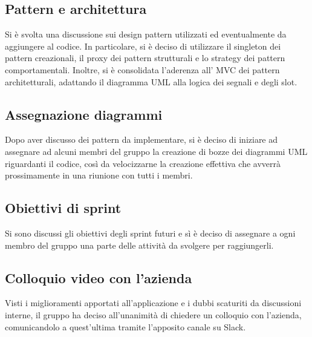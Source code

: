 \subsection{Pattern e architettura}
Si è svolta una discussione sui design pattern utilizzati ed eventualmente da aggiungere al codice. In particolare, si è deciso di utilizzare il singleton dei pattern creazionali,  il proxy dei pattern strutturali e lo strategy dei pattern comportamentali. Inoltre, si è consolidata l'aderenza all' MVC dei pattern architetturali, adattando il diagramma UML alla logica dei segnali e degli slot.

\subsection{Assegnazione diagrammi}
Dopo aver discusso dei pattern da implementare, si è deciso di iniziare ad assegnare ad alcuni membri del gruppo la creazione di bozze dei diagrammi UML riguardanti il codice, così da velocizzarne la creazione effettiva che avverrà prossimamente in una riunione con tutti i membri.

\subsection{Obiettivi di sprint}
Si sono discussi gli obiettivi degli sprint futuri e sì è deciso di assegnare a ogni membro del gruppo una parte delle attività da svolgere per raggiungerli. 

\subsection{Colloquio video con l'azienda}
Visti i miglioramenti apportati all'applicazione e i dubbi scaturiti da discussioni interne, il gruppo ha deciso all'unanimità di chiedere un colloquio con l'azienda, comunicandolo a quest'ultima tramite l'apposito canale su Slack.

\newpage


